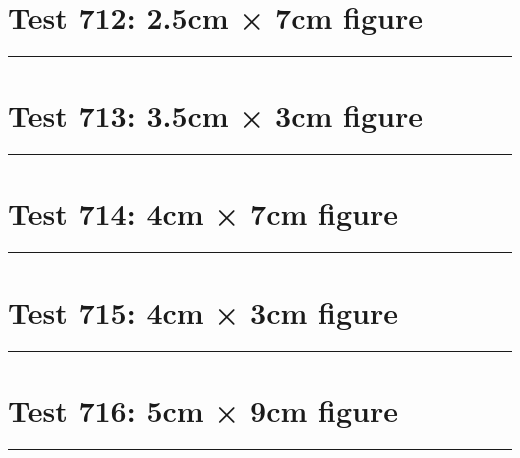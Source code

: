 \documentclass[a4paper,11pt]{article}
\begin{document}
\section*{Test 712: 2.5cm × 7cm figure}
\begin{swarmwrap}%
  \begin{minipage}[t]{2cm}
    \centering
    \rule{\linewidth}{7cm}
  \end{minipage}%
\end{swarmwrap}%
\swarmwrapnext
\lipsum[52]
\lipsum[53]
\lipsum[54]
\lipsum[55]
\lipsum[56]
\section*{Test 713: 3.5cm × 3cm figure}
\begin{swarmwrap}%
  \begin{minipage}[t]{3cm}
    \centering
    \rule{\linewidth}{3cm}
  \end{minipage}%
\end{swarmwrap}%
\swarmwrapnext
\lipsum[127]
\lipsum[128]
\lipsum[129]
\lipsum[130]
\lipsum[131]
\section*{Test 714: 4cm × 7cm figure}
\begin{swarmwrap}%
  \begin{minipage}[t]{4cm}
    \centering
    \rule{\linewidth}{7cm}
  \end{minipage}%
\end{swarmwrap}%
\swarmwrapnext
\lipsum[102]
\lipsum[103]
\lipsum[104]
\lipsum[105]
\lipsum[106]
\lipsum[107]
\section*{Test 715: 4cm × 3cm figure}
\begin{swarmwrap}%
  \begin{minipage}[t]{4cm}
    \centering
    \rule{\linewidth}{3cm}
  \end{minipage}%
\end{swarmwrap}%
\swarmwrapnext
\lipsum[92]
\lipsum[93]
\lipsum[94]
\lipsum[95]
\lipsum[96]
\section*{Test 716: 5cm × 9cm figure}
\begin{swarmwrap}%
  \begin{minipage}[t]{5cm}
    \centering
    \rule{\linewidth}{9cm}
  \end{minipage}%
\end{swarmwrap}%
\swarmwrapnext
\lipsum[78]
\lipsum[79]
\lipsum[80]
\lipsum[81]
\end{document}
